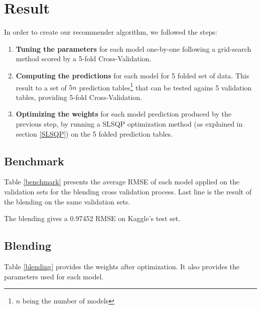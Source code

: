 \documentclass[10pt,conference,compsocconf]{IEEEtran}
\begin{document}
\section{Result}

In order to create our recommender algorithm, we followed the steps: 
\begin{enumerate}
\item \textbf{Tuning the parameters} for each model one-by-one following a grid-search method scored by a 5-fold Cross-Validation. 

\item \textbf{Computing the predictions} for each model for 5 folded set of data. This result to a set of $5n$ prediction tables\footnote{$n$ being the number of models} that can be tested agains 5 validation tables, providing 5-fold Cross-Validation.

\item \textbf{Optimizing the weights} for each model prediction produced by the previous step, by running a SLSQP optimization method (as explained in section \ref{SLSQP}) on the 5 folded prediction tables.
\end{enumerate}


\subsection{Benchmark}
\label{sec:model_bench}

Table \ref{benchmark} presents the average RMSE of each model applied on the validation sets for the blending cross validation process. Last line is the result of the blending on the same validation sets.


The blending gives a 0.97452 RMSE on Kaggle's test set. 


\subsection{Blending}

Table \ref{blending} provides the weights after optimization. It also provides the parameters used for each model.
\end{document}
